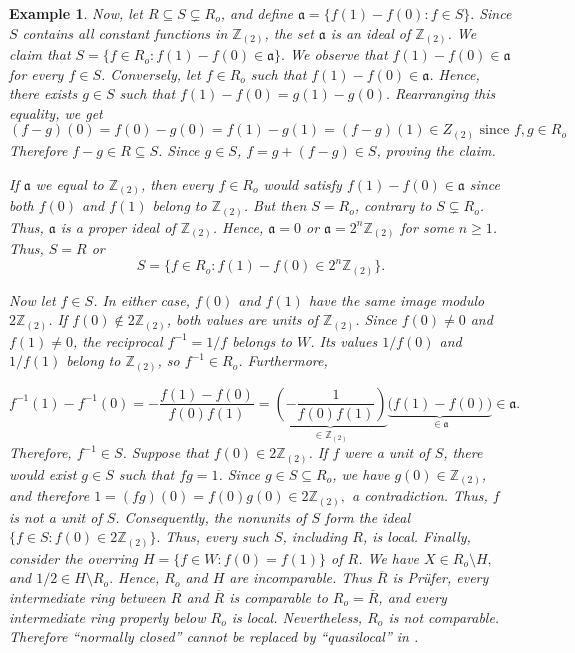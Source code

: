 \documentclass[12pt]{article}
\newtheorem{example}{Example}
\begin{document}
\begin{example}
		Now, let $R\subseteq S\subsetneq R_o$, and define $\mathfrak a= \{f(1)-f(0):f\in S\}. $ Since $S$ contains all constant functions in $\mathbb Z_{(2)}$, the set $\mathfrak a$ is an ideal of $\mathbb Z_{(2)}$. We claim that $S=\{f\in R_o:f(1)-f(0)\in\mathfrak a\}.$ We observe that $f(1)-f(0)\in\mathfrak a$ for every $f\in S$. Conversely, let $f\in R_o$ such that $f(1) -f(0) \in \mathfrak a$. Hence, there exists	$g\in S$ such that $ f(1) -f(0) = g(1) - g(0).$ Rearranging this equality, we get
		\[ (f-g)(0)=f(0)-g(0)=f(1)-g(1)=(f-g)(1)\in Z_{(2)}  \text{ since } f,g\in R_o\]
		Therefore $f-g\in R\subseteq S$. Since $g\in S$, $f=g+(f-g)\in S$, proving the claim.
	
		If $\mathfrak a$ we equal to $\mathbb Z_{(2)}$, then every $f\in R_o$ would satisfy $f(1)-f(0)\in\mathfrak a$ since both $f(0)$ and $f(1)$ belong to $\mathbb Z_{(2)}$. But then $S=R_o$, contrary to $S\subsetneq R_o$. Thus, $\mathfrak a$ is a proper ideal of $\mathbb Z_{(2)}$. Hence, $\mathfrak a=0$ or $\mathfrak a=2^n\mathbb Z_{(2)}$ for some 		$n\geq1$. Thus, $S=R$ or
		\[ S= \{f\in R_o: f(1)-f(0)\in2^n\mathbb Z_{(2)}\}.	\]
	
		Now let $f\in S$. In either case, $f(0)$ and $f(1)$ have the same image modulo $2\mathbb Z_{(2)}$. If $f(0)\notin2\mathbb Z_{(2)}$, both values are units of $\mathbb Z_{(2)}$. Since $f(0)\neq0$ and $f(1)\neq0$, the reciprocal $f^{-1}=1/f$ belongs to $W$. Its values $1/f(0)$ and $1/f(1)$ belong to $\mathbb Z_{(2)}$, so $f^{-1}\in R_o$. Furthermore,
	
		\[	f^{-1}(1)-f^{-1}(0)	=-\frac{f(1)-f(0)}{f(0)f(1)}= \underbrace{\left(-\frac{1}{f(0)f(1)}\right)}_{\in\mathbb Z_{(2)}}
		\underbrace{\bigl(f(1)-f(0)\bigr)}_{\in\mathfrak a}	\in\mathfrak a.	\]
		Therefore, $f^{-1}\in S$. Suppose that $f(0)\in2\mathbb Z_{(2)}$. If $f$ were a unit of $S$, there would exist $g\in S$ such that $fg=1$. Since $g\in S\subseteq R_o$, we have $g(0)\in\mathbb Z_{(2)}$, and therefore $1=(fg)(0)=f(0)g(0)\in2\mathbb Z_{(2)},$ a contradiction. Thus, $f$ is not a unit of $S$. Consequently, the nonunits of $S$ form the ideal $\{f\in S:f(0)\in2\mathbb Z_{(2)}\}.$ Thus, every such $S$, including $R$, is local. Finally, consider the overring $H=\{f\in W:f(0)=f(1)\}$ of $R$. We have $X\in R_o\setminus H,$ and $1/2\in H\setminus R_o.$ Hence, $R_o$ and $H$ are incomparable. Thus $\overline R$ is Prüfer, every intermediate ring between $R$ and $\overline R$ is comparable to $R_o=\overline R$, and every intermediate ring properly below $R_o$ is local.	Nevertheless, $R_o$ is not comparable. Therefore ``normally closed'' cannot be replaced by ``quasilocal'' in \cite[Theorem 24]{ayache}.
	\end{example}
\end{document}
